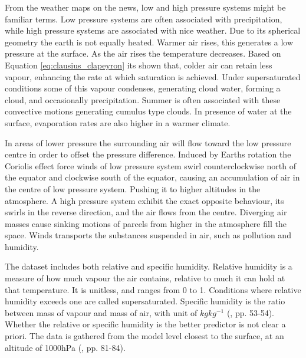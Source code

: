 From the weather maps on the news, low and high pressure systems might be familiar terms. Low pressure systems are often associated with precipitation, while high pressure systems are associated with nice weather. Due to its spherical geometry the earth is not equally heated. Warmer air rises, this generates a low pressure at the surface. As the air rises the temperature decreases. Based on Equation \eqref{eq:clausius_clapeyron} its shown that, colder air can retain less vapour, enhancing the rate at which saturation is achieved. Under supersaturated conditions some of this vapour condenses, generating cloud water, forming a cloud, and occasionally precipitation. Summer is often associated with these convective motions generating cumulus type clouds. In presence of water at the surface, evaporation rates are also higher in a warmer climate. 

In areas of lower pressure the surrounding air will flow toward the low pressure centre in order to offset the pressure difference. Induced by Earths rotation the Coriolis effect force winds of low pressure system swirl counterclockwise north of the equator and clockwise south of the equator, causing an accumulation of air in the centre of low pressure system. Pushing it to higher altitudes in the atmosphere. A high pressure system exhibit the exact opposite behaviour, its swirls in the reverse direction, and the air flows from the centre. Diverging air masses cause sinking motions of parcels from higher in the atmosphere fill the space.
Winds transports the substances suspended in air, such as pollution and humidity.

The dataset includes both relative and specific humidity. Relative humidity is a measure of how much vapour the air contains, relative to much it can hold at that temperature. It is unitless, and ranges from 0 to 1. Conditions where relative humidity exceeds one are called supersaturated. Specific humidity is the ratio between mass of vapour and mass of air, with unit of $kg kg^{-1}$ (\cite{lohmann2016}, pp. 53-54). Whether the relative or specific humidity is the better predictor is not clear a priori. The data is gathered from the model level closest to the surface, at an altitude of 1000hPa (\cite{lohmann2016}, pp. 81-84). 

